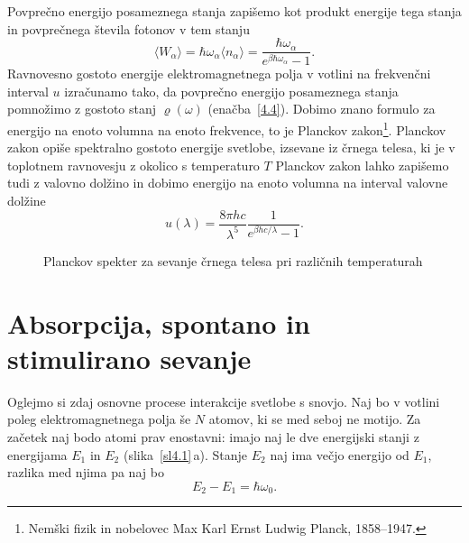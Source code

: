 Povprečno energijo posameznega stanja zapišemo kot produkt energije tega stanja in 
povprečnega števila fotonov v tem stanju
\begin{equation}
\langle W_{\alpha}\rangle = \hbar \omega_\alpha \langle n_\alpha \rangle
= \frac{\hbar \omega_\alpha}{e^{\beta\hbar\omega_{\alpha}}-1}.
\end{equation}
Ravnovesno gostoto energije elektromagnetnega polja v votlini na
frekvenčni interval $u$ izračunamo tako, da povprečno energijo posameznega
stanja pomnožimo z gostoto stanj $\varrho (\omega)$ 
(enačba~\ref{4.4}). Dobimo znano formulo za energijo na enoto volumna na enoto frekvence, 
to je Planckov 
zakon\footnote{Nemški fizik in nobelovec Max Karl Ernst Ludwig Planck, 1858--1947.}.
Planckov zakon opiše spektralno gostoto energije svetlobe, izsevane iz 
črnega telesa, ki je v toplotnem ravnovesju z 
okolico s temperaturo $T$
Planckov zakon lahko zapišemo tudi z valovno dolžino in dobimo energijo na enoto volumna
na interval valovne dolžine
\begin{equation}
u(\lambda)=\frac{8 \pi h c}{\lambda^5}\frac{1}{e^{\beta h c/\lambda}-1}.
\end{equation}

\begin{figure}[h]
\centering
\def\svgwidth{110truemm} 

\caption{Planckov spekter za sevanje črnega telesa pri različnih temperaturah}
\label{fig:Planck}
\end{figure}

\section{Absorpcija, spontano in stimulirano sevanje}
Oglejmo si zdaj osnovne procese interakcije svetlobe s snovjo. Naj
bo v votlini poleg elektromagnetnega polja še $N$ atomov, ki se med
seboj ne motijo. Za začetek naj bodo atomi prav enostavni:
imajo naj le dve energijski stanji z energijama $E_{1}$ in $E_{2}$ (slika~\ref{sl4.1}\,a). 
Stanje $E_2$ naj ima večjo energijo od $E_1$, razlika med njima pa naj bo
\begin{equation}
 E_2 - E_1 = \hbar \omega_0.
\end{equation}

